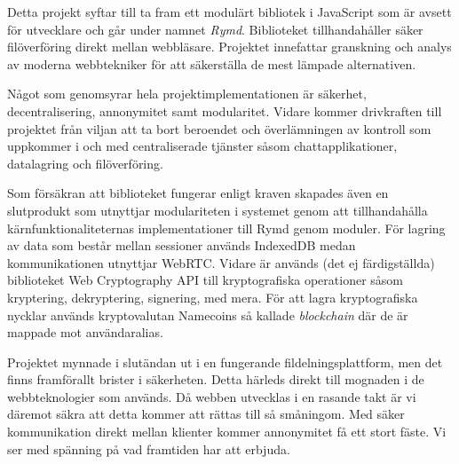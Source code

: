 Detta projekt syftar till ta fram ett modulärt bibliotek i JavaScript som är avsett för utvecklare och går under namnet \emph{Rymd}. Biblioteket tillhandahåller säker filöverföring direkt mellan webbläsare. Projektet innefattar granskning och analys av moderna webbtekniker för att säkerställa de mest lämpade alternativen.

Något som genomsyrar hela projektimplementationen är säkerhet, decentralisering, annonymitet samt modularitet. Vidare kommer drivkraften till projektet från viljan att ta bort beroendet och överlämningen av kontroll som uppkommer i och med centraliserade tjänster såsom chattapplikationer, datalagring och filöverföring.

Som försäkran att biblioteket fungerar enligt kraven skapades även en slutprodukt som utnyttjar modulariteten i systemet genom att tillhandahålla kärnfunktionaliteternas implementationer till Rymd genom moduler. För lagring av data som består mellan sessioner används IndexedDB medan kommunikationen utnyttjar WebRTC. Vidare är används (det ej färdigställda) biblioteket Web Cryptography API till kryptografiska operationer såsom kryptering, dekryptering, signering, med mera. För att lagra kryptografiska nycklar används kryptovalutan Namecoins så kallade \emph{blockchain} där de är mappade mot användaralias.

Projektet mynnade i slutändan ut i en fungerande fildelningsplattform, men det finns framförallt brister i säkerheten. Detta härleds direkt till mognaden i de webbteknologier som används. Då webben utvecklas i en rasande takt är vi däremot säkra att detta kommer att rättas till så småningom. Med säker kommunikation direkt mellan klienter kommer annonymitet få ett stort fäste. Vi ser med spänning på vad framtiden har att erbjuda.
